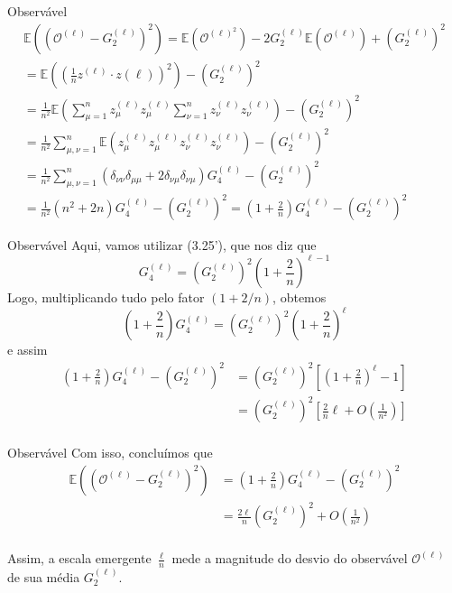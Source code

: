 \documentclass{beamer}
\newcommand{\EE}{\mathbb{E}}
\newcommand{\OO}{\mathcal{O}}
\def\eell{{(\ell)}}
\begin{document}
\begin{frame}{Observável}
	\small
	\begin{multline*}
		\EE\left(\left(\OO^\eell - G_2^\eell\right)^2\right) = \EE\left(\OO^{\eell^2}\right) - 2G_2^\eell \EE\left(\OO^\eell\right) + \left(G_2^\eell\right)^2 \\
		= \EE\left(\left(\frac{1}{n} z^\eell \cdot z\eell\right)^2\right) - \left(G_2^\eell\right)^2 \\
		= \frac{1}{n^2}\EE\left(\sum_{\mu=1}^{n} z_\mu^\eell z_\mu^\eell \sum_{\nu=1}^{n}z_\nu^\eell z_\nu^\eell \right) - \left(G_2^\eell\right)^2 \\
		= \frac{1}{n^2}\sum_{\mu,\nu=1}^{n} \EE\left(z_\mu^\eell z_\mu^\eell z_\nu^\eell z_\nu^\eell \right) - \left(G_2^\eell\right)^2 \\
		= \frac{1}{n^2}\sum_{\mu,\nu=1}^{n}\left( \delta_{\nu\nu}\delta_{\mu\mu} + 2\delta_{\nu\mu}\delta_{\nu\mu} \right)G_4^\eell - \left(G_2^\eell\right)^2 \\
		= \frac{1}{n^2}\left(n^2 + 2n\right)G_4^\eell - \left(G_2^\eell\right)^2 
		= \left(1+\frac{2}{n}\right)G_4^\eell -  \left(G_2^\eell\right)^2  
	\end{multline*}
\end{frame}

\begin{frame}{Observável}
	Aqui, vamos utilizar (3.25'), que nos diz que $$G_4^\eell = \left(G_2^\eell\right)^2\left(1 + \frac{2}{n}\right)^{\ell-1}$$
	Logo, multiplicando tudo pelo fator $(1+2/n)$, obtemos
	$$\left(1+\frac{2}{n}\right)G_4^\eell = \left(G_2^\eell\right)^2\left(1 + \frac{2}{n}\right)^{\ell}$$ 
	e assim
	\begin{align*}
		\left(1+\frac{2}{n}\right)G_4^\eell - \left(G_2^\eell\right)^2 &= \left(G_2^\eell\right)^2\left[\left(1 + \frac{2}{n}\right)^{\ell} - 1\right] \\
		&= \left(G_2^\eell\right)^2\left[\frac{2}{n}\ell + O\left(\frac{1}{n^2}\right)\right] \\
		\end{align*}
\end{frame}

\begin{frame}{Observável}
	Com isso, concluímos que 
	\begin{align*}\tag{3.33}
		\EE\left(\left(\OO^\eell - G_2^\eell\right)^2\right) &=
		\left(1+\frac{2}{n}\right)G_4^\eell -  \left(G_2^\eell\right)^2 \\
		&= \frac{2\ell}{n}\left(G_2^\eell\right)^2 + O\left(\frac{1}{n^2}\right) \\
	\end{align*}

	Assim, a escala emergente $\frac{\ell}{n}$  mede a magnitude do desvio do observável $\OO^\eell$ de sua média $G_2^\eell$.
\end{frame}
\end{document}
